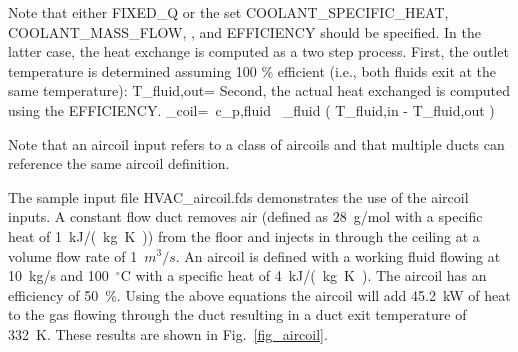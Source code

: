 \documentclass[11pt]{book}
\begin{document}
\noindent
Note that either {\ct FIXED\_Q} or the set {\ct COOLANT\_SPECIFIC\_HEAT}, {\ct COOLANT\_MASS\_FLOW}, , and {\ct EFFICIENCY} should be specified.  In the latter case, the heat exchange is computed as a two step process.  First, the outlet temperature is determined assuming 100 \% efficient (i.e., both fluids exit at the same temperature):
\be T_{\rm fluid,out}=
\ee
Second, the actual heat exchanged is computed using the {\ct EFFICIENCY}.
\be \dq_{\rm coil}=\eta \, c_{p,{\rm fluid}} \, \dm_{\rm fluid} \left( T_{\rm fluid,in} - T_{\rm fluid,out} \right)
\ee

\noindent
Note that an aircoil input refers to a class of aircoils and that multiple ducts can reference the same aircoil definition.

The sample input file {\ct HVAC\_aircoil.fds} demonstrates the use of the aircoil inputs.  A constant flow duct removes air (defined as 28~g/mol with a specific heat of 1~\si{kJ/(kg.K)}) from the floor and injects in through the ceiling at a volume flow rate of 1~$m^3/s$.  An aircoil is defined with a working fluid flowing at 10~kg/s and 100~$^\circ$C with a specific heat of 4~\si{kJ/(kg.K)}.  The aircoil has an efficiency of 50~\%.  Using the above equations the aircoil will add 45.2~kW of heat to the gas flowing through the duct resulting in a duct exit temperature of 332~K. These results are shown in  Fig.~\ref{fig_aircoil}.
\end{document}
